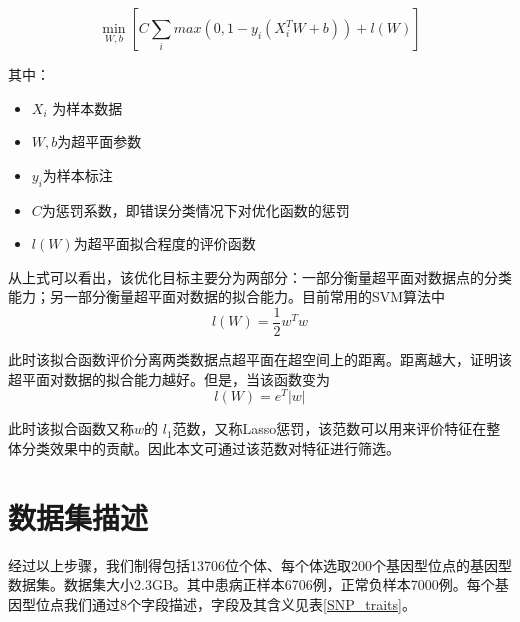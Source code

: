 \begin{equation}
    \min_{W,b} [C\sum_{i}max(0,1-y_i(X_i^TW+b))+l(W)]
\end{equation}

其中：

\begin{itemize}
\item
  \(X_i\) 为样本数据
\item
  \(W,b\)为超平面参数
\item
  \(y_i\)为样本标注
\item
  \(C\)为惩罚系数，即错误分类情况下对优化函数的惩罚
\item
  \(l(W)\)为超平面拟合程度的评价函数
\end{itemize}

从上式可以看出，该优化目标主要分为两部分：一部分衡量超平面对数据点的分类能力；另一部分衡量超平面对数据的拟合能力。目前常用的SVM算法中
\begin{equation}
    l(W)=\frac{1}{2}w^Tw
\end{equation}


此时该拟合函数评价分离两类数据点超平面在超空间上的距离。距离越大，证明该超平面对数据的拟合能力越好。但是，当该函数变为
\begin{equation}
    l(W)=e^T|w|
\end{equation}


此时该拟合函数又称$w$的 $l_1$范数，又称Lasso惩罚\cite{tibshirani_regression_1996}，该范数可以用来评价特征在整体分类效果中的贡献\cite{fung_feature_2004}。因此本文可通过该范数对特征进行筛选。

\section{数据集描述}
经过以上步骤，我们制得包括13706位个体、每个体选取200个基因型位点的基因型数据集。数据集大小2.3GB。其中患病正样本6706例，正常负样本7000例。每个基因型位点我们通过8个字段描述，字段及其含义见表\ref{SNP_traits}。

